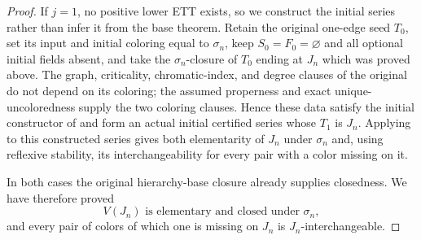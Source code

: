 \begin{proof}
If $j=1$, no positive lower ETT exists, so we construct the initial
series rather than infer it from the base theorem.  Retain the original
one-edge seed $T_0$, set its input and initial coloring equal to
$\sigma_n$, keep $S_0=F_0=\varnothing$ and all optional initial fields
absent, and take the $\sigma_n$-closure of $T_0$ ending at $J_n$ which
was proved above.  The graph, criticality, chromatic-index, and degree
clauses of the original  do not depend on its coloring;
the assumed properness and exact unique-uncoloredness supply the two
coloring clauses.  Hence these data satisfy the initial constructor of
 and form an actual initial certified series
whose $T_1$ is $J_n$.  Applying  to this
constructed series gives both elementarity of $J_n$ under $\sigma_n$ and,
using reflexive stability, its interchangeability for every pair with a
color missing on it.

In both cases the original hierarchy-base closure already supplies
closedness.  We have therefore proved
\[
 V(J_n)\text{ is elementary and closed under }\sigma_n,        \tag{2}
\]
and every pair of colors of which one is missing on $J_n$ is
$J_n$-interchangeable.


\end{proof}
